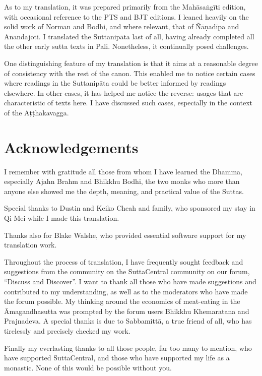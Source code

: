 \documentclass[12pt,openany]{book}%
\begin{document}
As to my translation, it was prepared primarily from the \textsanskrit{Mahāsaṅgīti} edition, with occasional reference to the PTS and BJT editions. I leaned heavily on the solid work of Norman and Bodhi, and where relevant, that of \textsanskrit{Ñāṇadīpa} and Ānandajoti. I translated the \textsanskrit{Suttanipāta} last of all, having already completed all the other early sutta texts in Pali. Nonetheless, it continually posed challenges.

One distinguishing feature of my translation is that it aims at a reasonable degree of consistency with the rest of the canon. This enabled me to notice certain cases where readings in the \textsanskrit{Suttanipāta} could be better informed by readings elsewhere. In other cases, it has helped me notice the reverse: usages that are characteristic of texts here. I have discussed such cases, especially in the context of the \textsanskrit{Aṭṭhakavagga}.

%
\chapter*{Acknowledgements}

I remember with gratitude all those from whom I have learned the Dhamma, especially Ajahn Brahm and Bhikkhu Bodhi, the two monks who more than anyone else showed me the depth, meaning, and practical value of the Suttas.

Special thanks to Dustin and Keiko Cheah and family, who sponsored my stay in Qi Mei while I made this translation.

Thanks also for Blake Walshe, who provided essential software support for my translation work.

Throughout the process of translation, I have frequently sought feedback and suggestions from the community on the SuttaCentral community on our forum, “Discuss and Discover”. I want to thank all those who have made suggestions and contributed to my understanding, as well as to the moderators who have made the forum possible. My thinking around the economics of meat-eating in the Āmagandhasutta was prompted by the forum users Bhikkhu Khemaratana and Prajnadeva. A special thanks is due to \textsanskrit{Sabbamittā}, a true friend of all, who has tirelessly and precisely checked my work. 

Finally my everlasting thanks to all those people, far too many to mention, who have supported SuttaCentral, and those who have supported my life as a monastic. None of this would be possible without you.
\end{document}
